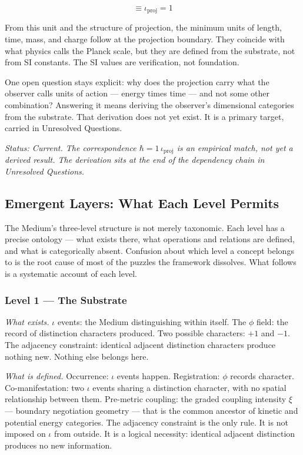\documentclass[11pt,letterpaper]{article}
\begin{document}
\begin{equation}
[\mathcal{A}] \equiv \iota_{\mathrm{proj}} = 1
\end{equation}

From this unit and the structure of projection, the minimum units of length, time, mass, and charge follow at the projection boundary. They coincide with what physics calls the Planck scale, but they are defined from the substrate, not from SI constants. The SI values are verification, not foundation.

One open question stays explicit: why does the projection carry what the observer calls units of action --- energy times time --- and not some other combination? Answering it means deriving the observer's dimensional categories from the substrate. That derivation does not yet exist. It is a primary target, carried in Unresolved Questions.

\emph{Status: Current. The correspondence \(\hbar = 1\,\iota_{\mathrm{proj}}\) is an empirical match, not yet a derived result. The derivation sits at the end of the dependency chain in Unresolved Questions.}

\subsection{Emergent Layers: What Each Level Permits}
\label{sec:org3933e4d}

The Medium's three-level structure is not merely taxonomic. Each level has a precise ontology --- what exists there, what operations and relations are defined, and what is categorically absent. Confusion about which level a concept belongs to is the root cause of most of the puzzles the framework dissolves. What follows is a systematic account of each level.

\subsubsection{Level 1 --- The Substrate}
\label{sec:org18cedbb}

\emph{What exists.} \(\iota\) events: the Medium distinguishing within itself. The \(\phi\) field: the record of distinction characters produced. Two possible characters: \(+1\) and \(-1\). The adjacency constraint: identical adjacent distinction characters produce nothing new. Nothing else belongs here.

\emph{What is defined.} Occurrence: \(\iota\) events happen. Registration: \(\phi\) records character. Co-manifestation: two \(\iota\) events sharing a distinction character, with no spatial relationship between them. Pre-metric coupling: the graded coupling intensity \(\xi\) --- boundary negotiation geometry --- that is the common ancestor of kinetic and potential energy categories. The adjacency constraint is the only rule. It is not imposed on \(\iota\) from outside. It is a logical necessity: identical adjacent distinction produces no new information.
\end{document}
